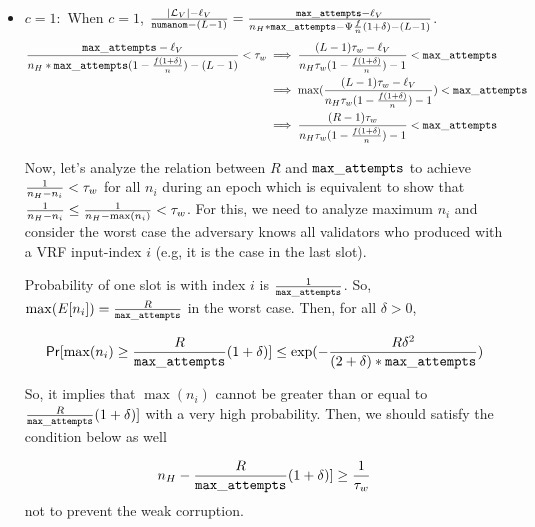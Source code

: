 \begin{itemize}
	\item $ c = 1: $ When $ c =1 $, $ \frac{|\mathcal{L}_V|- \ell_V}{\mathtt{numanom}-(L-1)} = \frac{\mathtt{max\_attempts} - \ell_V}{n_H*\mathtt{max\_attempts} -  \Psi \frac{f}{n} (1+ \delta)- (L-1)} $.
	\begin{align}\label{cond:eq1}
	\frac{\mathtt{max\_attempts} - \ell_V}{n_H*\mathtt{max\_attempts}(1-\frac{f(1+\delta)}{n}) - (L-1)} < \tau_w &\implies \frac{(L-1)\tau_w - \ell_V}{n_H\tau_w(1-\frac{f(1+\delta)}{n})-1} < \mathtt{max\_attempts} \nonumber \\
	&\implies \max(\frac{(L-1)\tau_w - \ell_V}{n_H\tau_w(1-\frac{f(1+\delta)}{n})-1}) < \mathtt{max\_attempts} \nonumber\\
	&\implies \frac{(R-1)\tau_w}{n_H\tau_w(1-\frac{f(1+\delta)}{n}) - 1} < \mathtt{max\_attempts} 
	\end{align}
	
	Now, let's analyze the relation between $ R $ and $ \mathtt{max\_attempts} $ to achieve $ \frac{1}{n_H - n_i} < \tau_w  $ for all $ n_i $ during an epoch which is equivalent to show that $\frac{1}{n_H - n_i}  \leq  \frac{1}{n_H - \max(n_i)} < \tau_w  $. For this, we need to analyze maximum $ n_i $ and consider the worst case the adversary knows all validators who produced with a VRF input-index $ i $ (e.g, it is the case in the last slot).
	
	Probability of one slot is with index $ i $ is $ \frac{1}{\mathtt{max\_attempts}} $. So, $ \max(E[n_{i}]) = \frac{R}{\mathtt{max\_attempts}} $ in the worst case. Then, for all $ \delta > 0 $,  
	
	
	\begin{equation}
	\mathsf{Pr}[\max(n_{i}) \geq \frac{R}{\mathtt{max\_attempts}} (1+\delta)] \leq \exp(-\frac{R\delta^2}{(2+\delta)*\mathtt{max\_attempts}})  \nonumber
	\end{equation} 
	
	So, it implies that $ \max(n_i) $ cannot be greater than or equal to $ \frac{R}{\mathtt{max\_attempts}} (1+\delta)] $ with a very high probability. Then, we should satisfy the condition below as well
	
	\begin{equation}\label{cond:neq1}
	n_H -\frac{R}{\mathtt{max\_attempts}} (1+\delta)]  \geq \frac{1}{\tau_w} 
	\end{equation}
	not to prevent the weak corruption.
	

\end{itemize}
